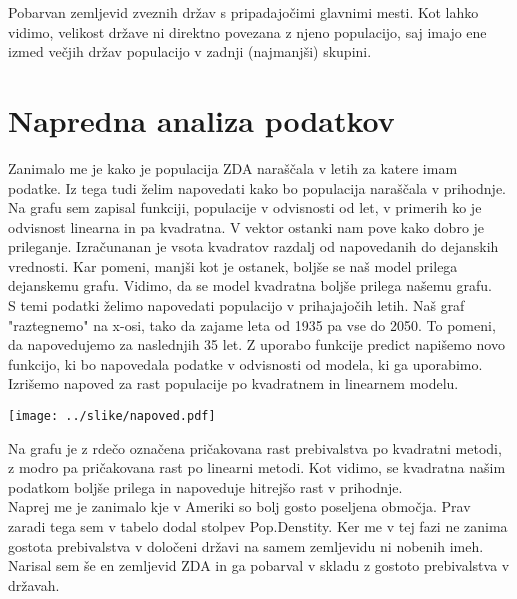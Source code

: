 \documentclass[11pt,a4paper]{article}
\begin{document}

Pobarvan zemljevid zveznih držav s pripadajočimi glavnimi mesti. Kot lahko vidimo, velikost države ni direktno povezana z njeno populacijo, saj imajo ene izmed večjih držav populacijo v zadnji (najmanjši) skupini.

\newpage
\section{Napredna analiza podatkov}

Zanimalo me je kako je populacija ZDA naraščala v letih za katere imam podatke. Iz tega tudi želim napovedati kako bo populacija naraščala v prihodnje. \\
Na grafu sem zapisal funkciji, populacije v odvisnosti od let, v primerih ko je odvisnost linearna in pa kvadratna. V vektor ostanki nam pove kako dobro je prileganje. Izračunanan je vsota kvadratov razdalj od napovedanih do dejanskih vrednosti. Kar pomeni, manjši kot je ostanek, boljše se naš model prilega dejanskemu grafu. Vidimo, da se model kvadratna boljše prilega našemu grafu. \\
S temi podatki želimo napovedati populacijo v prihajajočih letih. Naš graf "raztegnemo" na x-osi, tako da zajame leta od 1935 pa vse do 2050. To pomeni, da napovedujemo za naslednjih 35 let.
Z uporabo funkcije predict napišemo novo funkcijo, ki bo napovedala podatke v odvisnosti od modela, ki ga uporabimo.\\
Izrišemo napoved za rast populacije po kvadratnem in linearnem modelu.

\texttt{[image: ../slike/napoved.pdf]}

Na grafu je z rdečo označena pričakovana rast prebivalstva po kvadratni metodi, z modro pa pričakovana rast po linearni metodi. Kot vidimo, se kvadratna našim podatkom boljše prilega in napoveduje hitrejšo rast v prihodnje.\\

Naprej me je zanimalo kje v Ameriki so bolj gosto poseljena območja. Prav zaradi tega sem v tabelo dodal stolpev Pop.Denstity. Ker me v tej fazi ne zanima gostota prebivalstva v določeni državi na samem zemljevidu ni nobenih imeh. Narisal sem še en zemljevid ZDA in ga pobarval v skladu z gostoto prebivalstva v državah.

\end{document}
